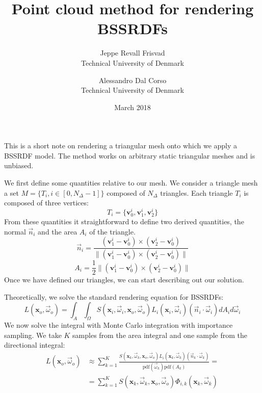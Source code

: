 \documentclass[10pt,a4paper]{article}
\title{Point cloud method for rendering BSSRDFs}
\date{March 2018}
\author{Jeppe Revall Frisvad \\ Technical University of Denmark
\and Alessandro Dal Corso \\ Technical University of Denmark}
\begin{document}
\maketitle

This is a short note on rendering a triangular mesh onto which we apply a BSSRDF model. The method works on arbitrary static triangular meshes and is unbiased.

We first define some quantities relative to our mesh. We consider a triangle mesh a set $M = \{T_i, i \in [0, N_\Delta - 1] \}$ composed of $N_{\Delta}$ triangles. Each triangle $T_i$ is composed of three vertices:
\begin{equation*}
T_i = \{ \mathbf{v}^i_0, \mathbf{v}^i_1, \mathbf{v}^i_2 \}
\end{equation*}
From these quantities it straightforward to define two derived quantities, the normal $\vec{n}_i$ and the area $A_i$ of the triangle. 
\begin{equation*}
\vec{n}_i = \frac{(\mathbf{v}^i_1 - \mathbf{v}^i_0) \times (\mathbf{v}^i_2 - \mathbf{v}^i_0) }{ \|(\mathbf{v}^i_1 - \mathbf{v}^i_0) \times (\mathbf{v}^i_2 - \mathbf{v}^i_0)  \|}
\end{equation*}
\begin{equation*}
A_i = \frac{1}{2} \|(\mathbf{v}^i_1 - \mathbf{v}^i_0) \times (\mathbf{v}^i_2 - \mathbf{v}^i_0) \|
\end{equation*}
Once we have defined our triangles, we can start describing out our solution. 

Theoretically, we solve the standard rendering equation for BSSRDFs:
\begin{equation*}
L(\mathbf{x}_o, \vec{\omega}_o) = \int_A \int_\Omega S(\mathbf{x}_i, \vec{\omega}_i, \mathbf{x}_o, \vec{\omega}_o) L_i(\mathbf{x}_i, \vec{\omega}_i) (\vec{n}_i \cdot \vec{\omega}_i) d A_i d \vec{\omega}_i 
\end{equation*}
We now solve the integral with Monte Carlo integration with importance sampling. We take $K$ samples from the area integral and one sample from the directional integral:
\begin{equation}
\label{eq:mc}
\begin{split}
L(\mathbf{x}_o, \vec{\omega}_o) &\approx \sum_{k = 1}^K \frac{S(\mathbf{x}_k, \vec{\omega}_k, \mathbf{x}_o, \vec{\omega}_o) L_i(\mathbf{x}_k, \vec{\omega}_k) (\vec{n}_k \cdot \vec{\omega}_k)}{\text{pdf}(\vec{\omega}_k) \text{pdf}(A_k)} = \\
&=  \sum_{k = 1}^K S(\mathbf{x}_k, \vec{\omega}_k, \mathbf{x}_o, \vec{\omega}_o) \Phi_{i,k}(\mathbf{x}_k, \vec{\omega}_k)
\end{split}
\end{equation}
\end{document}
